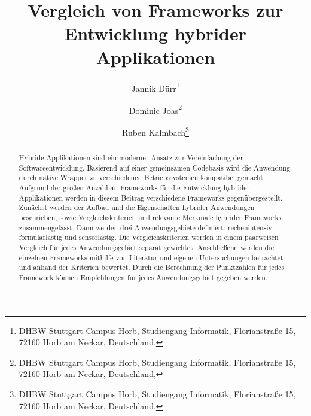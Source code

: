 \documentclass[]{lni}
\begin{document}
\title[Hybride Applikationen]{Vergleich von Frameworks zur Entwicklung hybrider Applikationen}
\author[Jannik Dürr \and Dominic Joas \and Ruben Kalmbach]
{Jannik Dürr\footnote{DHBW Stuttgart Campus Horb, Studiengang Informatik, Florianstraße 15, 72160 Horb am Neckar, Deutschland, } \and
Dominic Joas\footnote{DHBW Stuttgart Campus Horb, Studiengang Informatik, Florianstraße 15, 72160 Horb am Neckar, Deutschland, } \and
Ruben Kalmbach\footnote{DHBW Stuttgart Campus Horb, Studiengang Informatik, Florianstraße 15, 72160 Horb am Neckar, Deutschland, }}
\maketitle

\begin{abstract}
Hybride Applikationen sind ein moderner Ansatz zur Vereinfachung der Softwareentwicklung. Basierend auf einer gemeinsamen Codebasis wird die Anwendung durch native Wrapper zu verschiedenen Betriebssystemen kompatibel gemacht. Aufgrund der großen Anzahl an Frameworks für die Entwicklung hybrider Applikationen werden in diesem Beitrag verschiedene Frameworks gegenübergestellt. Zunächst werden der Aufbau und die Eigenschaften hybrider Anwendungen beschrieben, sowie Vergleichskriterien und relevante Merkmale hybrider Frameworks zusammengefasst. Dann werden drei Anwendungsgebiete definiert: rechenintensiv, formularlastig und sensorlastig. Die Vergleichskriterien werden in einem paarweisen Vergleich für jedes Anwendungsgebiet separat gewichtet. Anschließend werden die einzelnen Frameworks mithilfe von Literatur und eigenen Untersuchungen betrachtet und anhand der Kriterien bewertet. Durch die Berechnung der Punktzahlen für jedes Framework können Empfehlungen für jedes Anwendungsgebiet gegeben werden.
\end{abstract}
\end{document}
